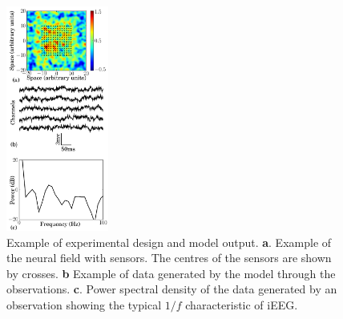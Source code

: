 \documentclass[12pt]{iopart}
\begin{document}
   \begin{figure}[th]\label{fig:experimental design}
   	\begin{center}
   		\includegraphics[width=0.3\textwidth]{./Graph/ExperimentFigurePy_1.pdf} 
   	\end{center}
   	\caption{Example of experimental design and model output. \textbf{a}. Example of the neural field with sensors. The centres of the sensors are shown by crosses. \textbf{b} Example of data generated by the model through the observations. \textbf{c}. Power spectral density of the data generated by an observation showing the typical $1/f$ characteristic of iEEG.} 
   \end{figure}
\end{document}
